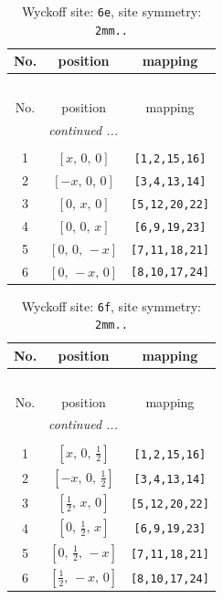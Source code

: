 \documentclass[fleqn,8pt]{jsarticle}
\begin{document}
\begin{longtable}{ccc}
\caption{Wyckoff site: {\tt 6e}, site symmetry: {\tt 2mm..}}
 \\
 \hline \hline
No. & position & mapping \\ \hline \endfirsthead

\multicolumn{2}{l}{\tablename\ \thetable{}} \\
 \hline \hline
No. & position & mapping \\ \hline \endhead

 \hline \hline
\multicolumn{2}{r}{\footnotesize\it continued ...} \\ \endfoot

 \hline \hline
\multicolumn{2}{r}{} \\ \endlastfoot

1 & $\left[ x,\, 0,\, 0 \right]$ & {\tt [1,2,15,16]} \\ \hline
2 & $\left[ - x,\, 0,\, 0 \right]$ & {\tt [3,4,13,14]} \\ \hline
3 & $\left[ 0,\, x,\, 0 \right]$ & {\tt [5,12,20,22]} \\ \hline
4 & $\left[ 0,\, 0,\, x \right]$ & {\tt [6,9,19,23]} \\ \hline
5 & $\left[ 0,\, 0,\, - x \right]$ & {\tt [7,11,18,21]} \\ \hline
6 & $\left[ 0,\, - x,\, 0 \right]$ & {\tt [8,10,17,24]} \\
\end{longtable}
\renewcommand{\arraystretch}{1.2}
\begin{longtable}{ccc}
\caption{Wyckoff site: {\tt 6f}, site symmetry: {\tt 2mm..}}
 \\
 \hline \hline
No. & position & mapping \\ \hline \endfirsthead

\multicolumn{2}{l}{\tablename\ \thetable{}} \\
 \hline \hline
No. & position & mapping \\ \hline \endhead

 \hline \hline
\multicolumn{2}{r}{\footnotesize\it continued ...} \\ \endfoot

 \hline \hline
\multicolumn{2}{r}{} \\ \endlastfoot

1 & $\left[ x,\, 0,\, \frac{1}{2} \right]$ & {\tt [1,2,15,16]} \\ \hline
2 & $\left[ - x,\, 0,\, \frac{1}{2} \right]$ & {\tt [3,4,13,14]} \\ \hline
3 & $\left[ \frac{1}{2},\, x,\, 0 \right]$ & {\tt [5,12,20,22]} \\ \hline
4 & $\left[ 0,\, \frac{1}{2},\, x \right]$ & {\tt [6,9,19,23]} \\ \hline
5 & $\left[ 0,\, \frac{1}{2},\, - x \right]$ & {\tt [7,11,18,21]} \\ \hline
6 & $\left[ \frac{1}{2},\, - x,\, 0 \right]$ & {\tt [8,10,17,24]} \\
\end{longtable}
\end{document}
